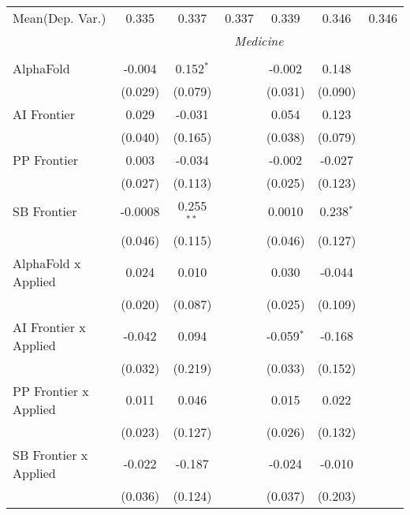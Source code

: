 \begin{tabular}{lcccccc}
Mean(Dep. Var.) & 0.335 & 0.337 & 0.337 & 0.339 & 0.346 & 0.346 \\
 & \multicolumn{6}{c}{\textit{Medicine}} \\ \\
   AlphaFold                      & -0.004  & 0.152$^{*}$  &                & -0.002       & 0.148       &   \\   
                                  & (0.029) & (0.079)      &                & (0.031)      & (0.090)     &   \\   
   AI Frontier                    & 0.029   & -0.031       &                & 0.054        & 0.123       &   \\   
                                  & (0.040) & (0.165)      &                & (0.038)      & (0.079)     &   \\   
   PP Frontier                    & 0.003   & -0.034       &                & -0.002       & -0.027      &   \\   
                                  & (0.027) & (0.113)      &                & (0.025)      & (0.123)     &   \\   
   SB Frontier                    & -0.0008 & 0.255$^{**}$ &                & 0.0010       & 0.238$^{*}$ &   \\   
                                  & (0.046) & (0.115)      &                & (0.046)      & (0.127)     &   \\   
   AlphaFold x Applied            & 0.024   & 0.010        &                & 0.030        & -0.044      &   \\   
                                  & (0.020) & (0.087)      &                & (0.025)      & (0.109)     &   \\   
   AI Frontier x Applied          & -0.042  & 0.094        &                & -0.059$^{*}$ & -0.168      &   \\   
                                  & (0.032) & (0.219)      &                & (0.033)      & (0.152)     &   \\   
   PP Frontier x Applied          & 0.011   & 0.046        &                & 0.015        & 0.022       &   \\   
                                  & (0.023) & (0.127)      &                & (0.026)      & (0.132)     &   \\   
   SB Frontier x Applied          & -0.022  & -0.187       &                & -0.024       & -0.010      &   \\   
                                  & (0.036) & (0.124)      &                & (0.037)      & (0.203)     &   \\   

\end{tabular}
